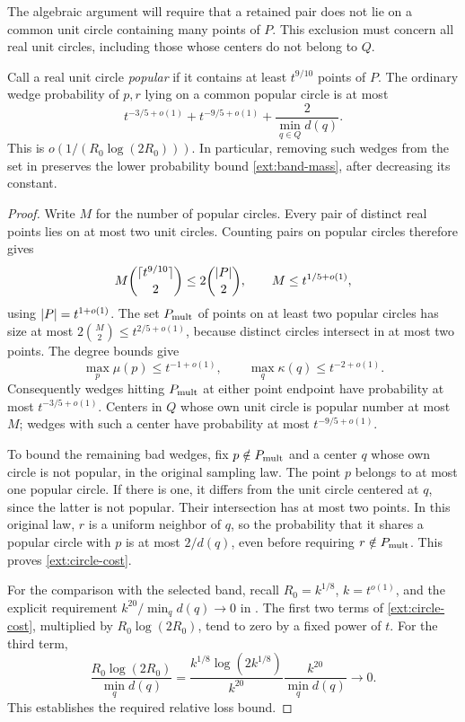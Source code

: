 The algebraic argument will require that a retained pair does not lie
on a common unit circle containing many points of \(P\).  This exclusion
must concern all real unit circles, including those whose centers do
not belong to \(Q\).

\begin{lemma}\label{ext:circles}
Call a real unit circle \emph{popular} if it contains at least
\(t^{9/10}\) points of \(P\).  The ordinary wedge probability of
\(p,r\) lying on a common popular circle is at most
\begin{equation}\label{ext:circle-cost}
 t^{-3/5+o(1)}+t^{-9/5+o(1)}+\frac{2}{\min_{q\in Q}d(q)}.
\end{equation}
This is \(o(1/(R_0\log(2R_0)))\).  In particular, removing such wedges
from the set in  preserves the lower probability bound
\eqref{ext:band-mass}, after decreasing its constant.
\end{lemma}

\begin{proof}
Write \(M\) for the number of popular circles.  Every pair of distinct
real points lies on at most two unit circles.  Counting pairs on popular
circles therefore gives
\[
 M\binom{\lceil t^{9/10}\rceil}{2}
 \le2\binom{\lvert P\rvert}{2},\qquad M\le t^{1/5+o(1)},
\]
using \(\lvert P\rvert=t^{1+o(1)}\).
The set \(P_{\rm mult}\) of points on at least two popular circles has
size at most \(2\binom M2\le t^{2/5+o(1)}\), because distinct circles
intersect in at most two points.  The degree bounds give
\[
 \max_p\mu(p)\le t^{-1+o(1)},\qquad
 \max_q\kappa(q)\le t^{-2+o(1)}.
\]
Consequently wedges hitting \(P_{\rm mult}\) at either point endpoint
have probability at most \(t^{-3/5+o(1)}\).  Centers in \(Q\) whose
own unit circle is popular number at most \(M\); wedges with such a
center have probability at most \(t^{-9/5+o(1)}\).

To bound the remaining bad wedges, fix \(p\notin P_{\rm mult}\) and
a center \(q\) whose own circle is not popular, in the original sampling
law.  The point \(p\) belongs to at most one popular circle.  If there is
one, it differs from the unit circle centered at \(q\), since the
latter is not popular.  Their intersection has at most two points.
In this original law, \(r\) is a uniform neighbor of \(q\), so the
probability that it shares a popular circle with \(p\) is at most
\(2/d(q)\), even before requiring \(r\notin P_{\rm mult}\).
This proves \eqref{ext:circle-cost}.

For the comparison with the selected band, recall
\(R_0=k^{1/8}\), \(k=t^{o(1)}\), and the explicit requirement
\(k^{20}/\min_qd(q)\to0\) in .
The first two terms of \eqref{ext:circle-cost}, multiplied by
\(R_0\log(2R_0)\), tend to zero by a fixed power of \(t\).
For the third term,
\[
 \frac{R_0\log(2R_0)}{\min_qd(q)}
 =\frac{k^{1/8}\log(2k^{1/8})}{k^{20}}
                  \frac{k^{20}}{\min_qd(q)}\longrightarrow0.
\]
This establishes the required relative loss bound.
\end{proof}

